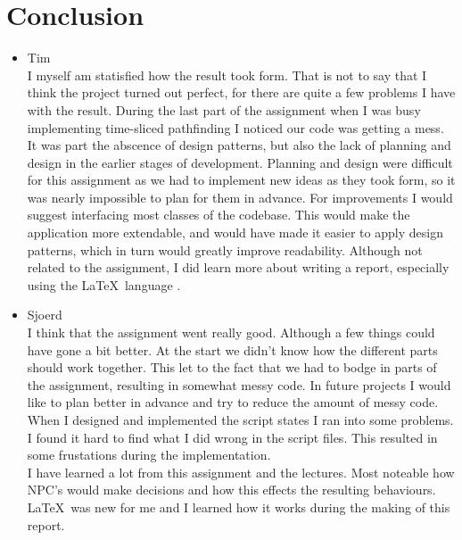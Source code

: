 \documentclass[10pt]{extarticle} %
\begin{document}
   \section {Conclusion}
   \begin{itemize}
   \item Tim\\
	I myself am statisfied how the result took form.
	That is not to say that I think the project turned out perfect, for there are quite a few problems I have with the result.
	During the last part of the assignment when I was busy implementing time-sliced pathfinding I noticed our code was getting a mess.
	It was part the abscence of design patterns, but also the lack of planning and design in the earlier stages of development.
	Planning and design were difficult for this assignment as we had to implement new ideas as they took form, so it was nearly impossible to plan for them in advance.
	For improvements I would suggest interfacing most classes of the codebase. This would make the application more extendable, and would have made it easier to apply design patterns, which in turn would greatly improve readability.
	Although not related to the assignment, I did learn more about writing a report, especially using the \LaTeX\ language \cite{bibmisc}\cite{textut}.
   \item Sjoerd\\
   I think that the assignment went really good. Although a few things could have gone a bit better. At the start we didn't know how the different parts should work together. This let to the fact that we had to bodge in parts of the assignment, resulting in somewhat messy code. In future projects I would like to plan better in advance and try to reduce the amount of messy code.\\
When I designed and implemented the script states I ran into some problems. I found it hard to find what I did wrong in the script files. This resulted in some frustations during the implementation.\\
I have learned a lot from this assignment and the lectures. Most noteable how NPC's would make decisions and how this effects the resulting behaviours. \LaTeX\ was new for me and I learned how it works during the making of this report. \\

   \end{itemize}

\newpage
 
\end{document}
